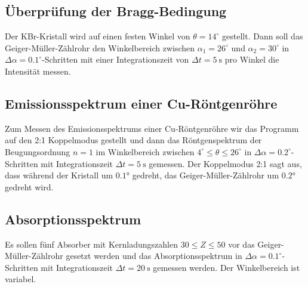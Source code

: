 \subsection{Überprüfung der Bragg-Bedingung}
Der KBr-Kristall wird auf einen festen Winkel von $\theta=14^{\circ}$ gestellt. Dann soll das Geiger-Müller-Zählrohr den Winkelbereich zwischen $\alpha_{1}=26^{\circ}$ und $\alpha_{2}=30^{\circ}$ in $\Delta\alpha=0.1^{\circ}$-Schritten mit einer Integrationszeit von $\Delta t=5\ \si{\s}$ pro Winkel die Intensität messen.

\subsection{Emissionsspektrum einer Cu-Röntgenröhre}
Zum Messen des Emissionsspektrums einer Cu-Röntgenröhre wir das Programm auf den 2:1 Koppelmodus gestellt und dann das Röntgenspektrum der Beugungsordnung $n=1$ im Winkelbereich zwischen $4^{\circ}\leq\theta\leq 26^{\circ}$ in $\Delta\alpha=0.2^{\circ}$-Schritten mit Integrationszeit $\Delta t=5\ \si{\s}$ gemessen. Der Koppelmodus 2:1 sagt aus, dass während der Kristall um $0.1$° gedreht, das Geiger-Müller-Zählrohr um $0.2$° gedreht wird. 

\subsection{Absorptionsspektrum}
Es sollen fünf Absorber mit Kernladungszahlen $30\leq Z\leq 50$ vor das Geiger-Müller-Zählrohr gesetzt werden und das Absorptionsspektrum in $\Delta\alpha=0.1^{\circ}$-Schritten mit Integrationszeit $\Delta t=20\ \si{\s}$ gemessen werden. Der Winkelbereich ist variabel.

